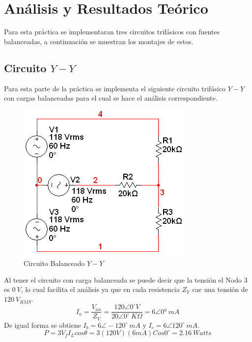\documentclass[twocolumn]{IEEEtran}
\begin{document}
\section{Análisis y Resultados Teórico}
\noindent
Para esta práctica se implementaran tres circuitos trifásicos con fuentes balanceadas, a continuación se muestran los montajes de estos.

\subsection{Circuito $Y-Y$}
\noindent
Para esta parte de la práctica se implementa el siguiente circuito trifásico $Y-Y$ con cargas balanceadas para el cual se hace el análisis correspondiente.
\begin{figure}[H]
	\centering
		\includegraphics[scale=0.7]{circYY.PNG}
	\caption{Circuito Balanceado $Y-Y$}
	\label{fig13}
\end{figure}
\noindent
Al tener el circuito con carga balanceada se puede decir que la tensión el Nodo $3$ es $0\ V$, lo cual facilita el análisis ya que en cada resistencia $Z_Y$ cae  una tensión de $120\ V_{RMS}$.
\begin{equation}
 {I_a} =\frac {V_{an}}{Z_Y} =\frac {120 \angle 0^\circ V}{ 20 \angle 0^\circ\ K \Omega}= 6\angle 0°\ mA
\label{ecu56}
\end{equation}
\noindent
De igual forma se obtiene  $I_b= 6\angle -120^\circ\ mA$ y $I_c= 6\angle 120^\circ \ mA$.
\begin{equation}
 P = 3  V_f  I_L  cos \theta = 3(120 V)(6 mA)Cos 0^\circ = 2.16\ Watts
\label{ecu57}
\end{equation}
\end{document}
